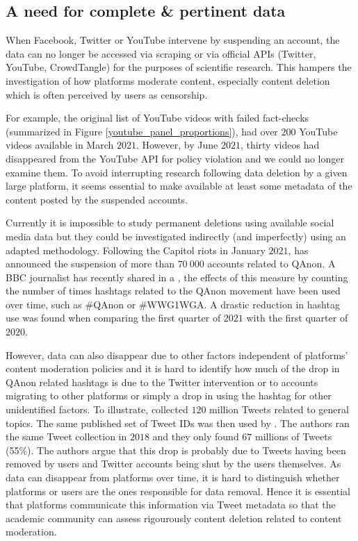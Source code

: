 \documentclass[Afour,sageh,times]{sagej}
\begin{document}
\subsection{A need for complete \& pertinent data}

When Facebook, Twitter or YouTube intervene by suspending an account, the data can no longer be accessed via scraping or via official APIs (Twitter, YouTube, CrowdTangle) for the purposes of scientific research. This hampers the investigation of how platforms moderate content, especially content deletion which is often perceived by users as censorship.

For example, the original list of YouTube videos with failed fact-checks (summarized in Figure \ref{youtube_panel_proportions}), had over $200$ YouTube videos available in March $2021$. 
However, by June $2021$, thirty videos had disappeared from the YouTube API for policy violation and we could no longer examine them. 
To avoid interrupting research following data deletion by a given large platform, it seems essential to make available at least some metadata of the content posted by the suspended accounts.

Currently it is impossible to study permanent deletions using available social media data but they could be investigated indirectly (and imperfectly) using an adapted methodology.
Following the Capitol riots in January $2021$, \cite{twitterdc} has announced the suspension of more than $70~000$ accounts related to QAnon.
A BBC journalist has recently shared in a \cite{tweetBBC}, the effects of this measure by counting the number of times hashtags related to the QAnon movement have been used over time, such as \#QAnon or \#WWG1WGA.
A drastic reduction in hashtag use was found when comparing the first quarter of $2021$ with the first quarter of $2020$.

However, data can also disappear due to other factors independent of platforms' content moderation policies and it is hard to identify how much of the drop in QAnon related hashtags is due to the Twitter intervention or to accounts migrating to other platforms or simply a drop in using the hashtag for other unidentified factors.
To illustrate, \cite{mcminn2013building} collected $120$ million Tweets related to general topics. 
The same published set of Tweet IDs was then used by \cite{mazoyer2020french}. The authors ran the same Tweet collection in $2018$ and they only found $67$ millions of Tweets (55\%). The authors argue that this drop is probably due to Tweets having been removed by users and Twitter accounts being shut by the users themselves.
As data can disappear from platforms over time, it is hard to distinguish whether platforms or users are the ones responsible for data removal. Hence it is essential that platforms communicate this information via Tweet metadata so that the academic community can assess rigourously content deletion related to content moderation.
\end{document}
